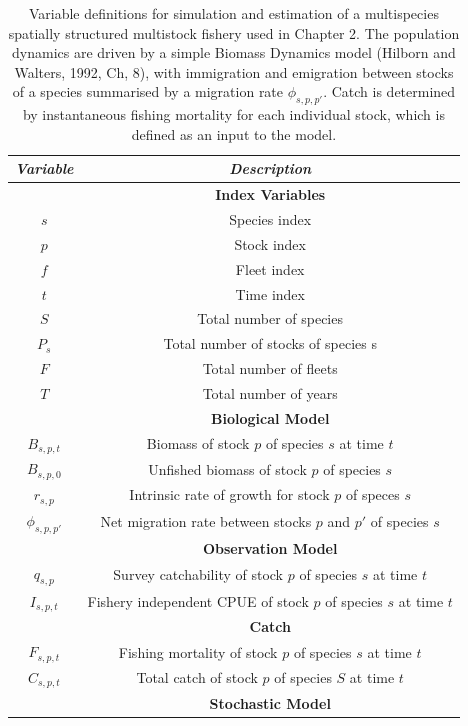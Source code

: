 \documentclass[]{scrartcl}
\begin{document}
\begin{table}[htbp]
\begin{center}
\caption{Variable definitions for simulation and estimation of a multispecies spatially structured multistock fishery used in Chapter 2. The population dynamics are driven by a simple Biomass Dynamics model (Hilborn and Walters, 1992, Ch, 8), with immigration and emigration between stocks of a species summarised by a migration rate $\phi_{s,p,p'}$. Catch is determined by instantaneous fishing mortality for each individual stock, which is defined as an input to the model.}\label{tab:Ch2spec}
\begin{tabular}{c|c}
\textit{Variable} & \textit{Description}  \\
\hline
& \textbf{ Index Variables} \\
\hline
$s$ & Species index \\
$p$ & Stock index \\
$f$ & Fleet index \\
$t$ & Time index \\
$S$ & Total number of species \\
$P_s$ & Total number of stocks of species s \\
$F$ & Total number of fleets \\
$T$ & Total number of years \\
\hline
& \textbf{ Biological Model} \\
\hline
$B_{s,p,t}$ & Biomass of stock $p$ of species $s$ at time $t$ \\
$B_{s,p,0}$ & Unfished biomass of stock $p$ of species $s$ \\
$r_{s,p}$ & Intrinsic rate of growth for stock $p$ of speces $s$ \\
$\phi_{s,p,p'}$ &  Net migration rate between stocks $p$ and $p'$ of species $s$ \\
\hline
& \textbf{ Observation Model} \\
\hline
$q_{s,p}$ & Survey catchability of stock $p$ of species $s$ at time $t$ \\
$I_{s,p,t}$ & Fishery independent CPUE of stock $p$ of species $s$ at time $t$ \\
\hline
& \textbf{ Catch} \\
\hline
$F_{s,p,t}$ & Fishing mortality of stock $p$ of species $s$ at time $t$ \\
$C_{s,p,t}$ & Total catch of stock $p$ of species $S$ at time $t$ \\
\hline
& \textbf{ Stochastic Model } \\

\end{tabular}
\end{center}
\end{table}
\end{document}
